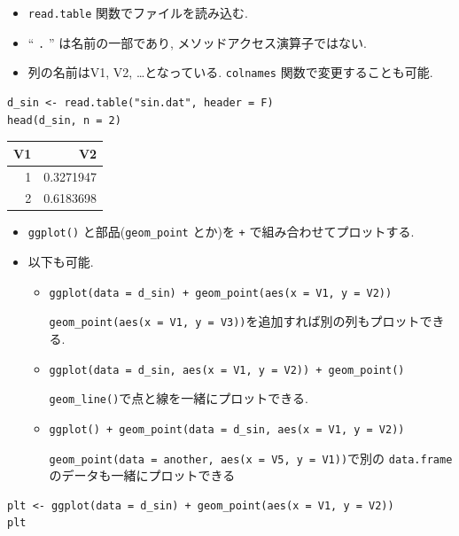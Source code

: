 \documentclass[lualatex,a4paper,12pt,report,ja=standard]{bxjsarticle}
\begin{document}
\begin{itemize}
\item \texttt{read.table} 関数でファイルを読み込む.
\item `` \texttt{.} '' は名前の一部であり, メソッドアクセス演算子ではない.
\item 列の名前はV1, V2, \ldots{}となっている.
\texttt{colnames} 関数で変更することも可能.
\end{itemize}
\begin{verbatim}
d_sin <- read.table("sin.dat", header = F)
head(d_sin, n = 2)
\end{verbatim}

\begin{center}
\begin{tabular}{rr}
V1 & V2\\
\hline
1 & 0.3271947\\
2 & 0.6183698\\
\hline
\end{tabular}
\end{center}

\begin{itemize}
\item \texttt{ggplot()} と部品(\texttt{geom\_point} とか)を \texttt{+} で組み合わせてプロットする.
\item 以下も可能.
\begin{itemize}
\item \texttt{ggplot(data = d_sin) + geom_point(aes(x = V1, y = V2))}

\texttt{geom_point(aes(x = V1, y = V3))}を追加すれば別の列もプロットできる.
\item \texttt{ggplot(data = d_sin, aes(x = V1, y = V2)) + geom_point()}

\texttt{geom_line()}で点と線を一緒にプロットできる.
\item \texttt{ggplot() + geom_point(data = d_sin, aes(x = V1, y = V2))}

\texttt{geom_point(data = another, aes(x = V5, y = V1))}で別の \texttt{data.frame} のデータも一緒にプロットできる
\end{itemize}
\end{itemize}
\begin{verbatim}
plt <- ggplot(data = d_sin) + geom_point(aes(x = V1, y = V2))
plt
\end{verbatim}
\end{document}

